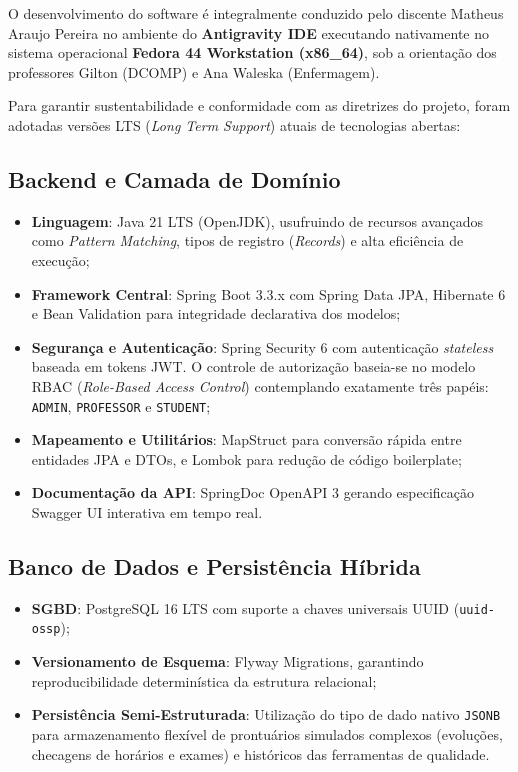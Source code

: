 O desenvolvimento do software é integralmente conduzido pelo discente Matheus Araujo Pereira no ambiente do \textbf{Antigravity IDE} executando nativamente no sistema operacional \textbf{Fedora 44 Workstation (x86\_64)}, sob a orientação dos professores Gilton (DCOMP) e Ana Waleska (Enfermagem).

Para garantir sustentabilidade e conformidade com as diretrizes do projeto, foram adotadas versões LTS (\textit{Long Term Support}) atuais de tecnologias abertas:

\subsection{Backend e Camada de Domínio}
\begin{itemize}
    \item \textbf{Linguagem}: Java 21 LTS (OpenJDK), usufruindo de recursos avançados como \textit{Pattern Matching}, tipos de registro (\textit{Records}) e alta eficiência de execução;
    \item \textbf{Framework Central}: Spring Boot 3.3.x com Spring Data JPA, Hibernate 6 e Bean Validation para integridade declarativa dos modelos;
    \item \textbf{Segurança e Autenticação}: Spring Security 6 com autenticação \textit{stateless} baseada em tokens JWT. O controle de autorização baseia-se no modelo RBAC (\textit{Role-Based Access Control}) contemplando exatamente três papéis: \texttt{ADMIN}, \texttt{PROFESSOR} e \texttt{STUDENT};
    \item \textbf{Mapeamento e Utilitários}: MapStruct para conversão rápida entre entidades JPA e DTOs, e Lombok para redução de código boilerplate;
    \item \textbf{Documentação da API}: SpringDoc OpenAPI 3 gerando especificação Swagger UI interativa em tempo real.
\end{itemize}

\subsection{Banco de Dados e Persistência Híbrida}
\begin{itemize}
    \item \textbf{SGBD}: PostgreSQL 16 LTS com suporte a chaves universais UUID (\texttt{uuid-ossp});
    \item \textbf{Versionamento de Esquema}: Flyway Migrations, garantindo reproducibilidade determinística da estrutura relacional;
    \item \textbf{Persistência Semi-Estruturada}: Utilização do tipo de dado nativo \texttt{JSONB} para armazenamento flexível de prontuários simulados complexos (evoluções, checagens de horários e exames) e históricos das ferramentas de qualidade.
\end{itemize}

